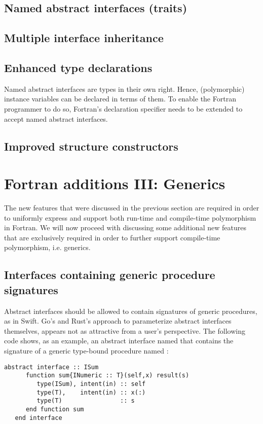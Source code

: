 \documentclass[11pt,oneside]{article}
\newcommand{\code}[1]{{\selectfont\ttfamily{#1}}}
\begin{document}
\subsection{Named abstract interfaces (traits)}

\subsection{Multiple interface inheritance}

\subsection{Enhanced type declarations}

Named abstract interfaces are types in their own right. Hence,
(polymorphic) instance variables can be declared in terms of them. To
enable the Fortran programmer to do so, Fortran's \code{type}
declaration specifier needs to be extended to accept named abstract
interfaces.

\subsection{Improved structure constructors}


\newpage

\section{Fortran additions III: Generics}

The new features that were discussed in the previous section are
required in order to uniformly express and support both run-time and
compile-time polymorphism in Fortran. We will now proceed with
discussing some additional new features that are exclusively required
in order to further support compile-time polymorphism, i.e. generics.

\subsection{Interfaces containing generic procedure signatures}
\label{sect:generic_interfaces}

Abstract interfaces should be allowed to contain signatures of generic
procedures, as in Swift. Go's and Rust's approach to parameterize
abstract interfaces themselves, appears not as attractive from a
user's perspective. The following code shows, as an example, an
abstract interface named \code{ISum} that contains the signature of a
generic type-bound procedure named \code{sum}:
\begin{lstlisting}[language=LFortran,style=boxed]
   abstract interface :: ISum
      function sum{INumeric :: T}(self,x) result(s)
         type(ISum), intent(in) :: self
         type(T),    intent(in) :: x(:)
         type(T)                :: s
      end function sum
   end interface
\end{lstlisting}
\end{document}
